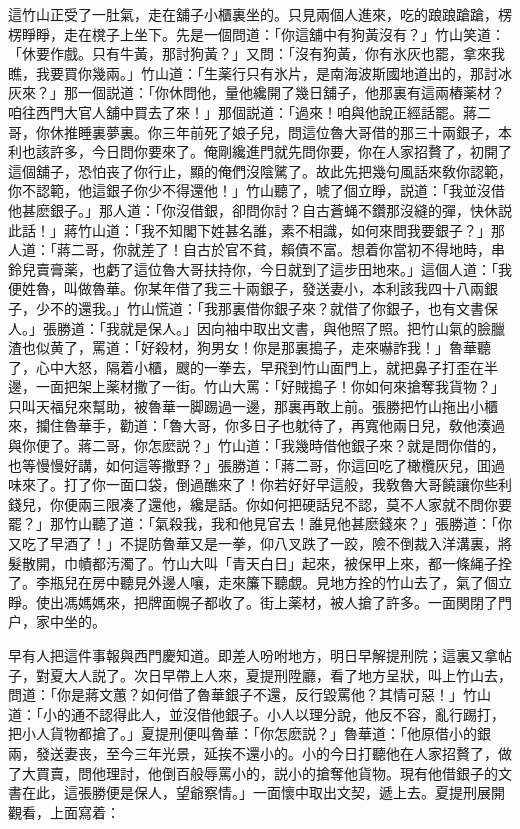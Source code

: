 這竹山正受了一肚氣，走在舖子小櫃裏坐的。只見兩個人進來，吃的踉踉蹌蹌，楞楞睜睜，走在櫈子上坐下。先是一個問道：「你這舖中有狗黃沒有？」竹山笑道：「休要作戲。只有牛黃，那討狗黃？」又問：「沒有狗黃，你有氷灰也罷，拿來我瞧，我要買你幾兩。」竹山道：「生薬行只有氷片，是南海波斯國地道出的，那討冰灰來？」那一個説道：「你休問他，量他纔開了幾日舖子，他那裏有這兩樁薬材？咱往西門大官人舖中買去了來！」那個説道：「過來！咱與他說正經話罷。蔣二哥，你休推睡裏夢裏。你三年前死了娘子兒，問這位魯大哥借的那三十兩銀子，本利也該許多，今日問你要來了。俺剛纔進門就先問你要，你在人家招贅了，初開了這個舖子，恐怕丧了你行止，顯的俺們沒陰騭了。故此先把幾句風話來敎你認範，你不認範，他這銀子你少不得還他！」竹山聽了，唬了個立睜，説道：「我並沒借他甚麽銀子。」那人道：「你沒借銀，卻問你討？自古蒼蝇不鑽那沒縫的彈，快休説此話！」蔣竹山道：「我不知閣下姓甚名誰，素不相識，如何來問我要銀子？」那人道：「蔣二哥，你就差了！自古於官不貧，賴債不富。想着你當初不得地時，串鈴兒賣膏薬，也虧了這位魯大哥扶持你，今日就到了這步田地來。」這個人道：「我便姓魯，叫做魯華。你某年借了我三十兩銀子，發送妻小，本利該我四十八兩銀子，少不的還我。」竹山慌道：「我那裏借你銀子來？就借了你銀子，也有文書保人。」張勝道：「我就是保人。」因向袖中取出文書，與他照了照。把竹山氣的臉臘渣也似黄了，罵道：「好殺材，狗男女！你是那裏搗子，走來嚇詐我！」魯華聽了，心中大怒，隔着小櫃，颼的一拳去，早飛到竹山面門上，就把鼻子打歪在半邊，一面把架上薬材撒了一街。竹山大罵：「好賊搗子！你如何來搶奪我貨物？」只叫天福兒來幫助，被魯華一脚踢過一邊，那裏再敢上前。張勝把竹山拖出小櫃來，攔住魯華手，勸道：「魯大哥，你多日子也躭待了，再寬他兩日兒，敎他湊過與你便了。蔣二哥，你怎麽説？」竹山道：「我幾時借他銀子來？就是問你借的，也等慢慢好講，如何這等撒野？」張勝道：「蔣二哥，你這回吃了橄欖灰兒，囬過味來了。打了你一面口袋，倒過醮來了！你若好好早這般，我敎魯大哥饒讓你些利錢兒，你便兩三限凑了還他，纔是話。你如何把硬話兒不認，莫不人家就不問你要罷？」那竹山聽了道：「氣殺我，我和他見官去！誰見他甚麽錢來？」張勝道：「你又吃了早酒了！」不提防魯華又是一拳，仰八叉跌了一跤，險不倒裁入洋溝裏，將髮散開，巾幘都汚濁了。竹山大叫「青天白日」起來，被保甲上來，都一條䋲子拴了。李瓶兒在房中聽見外邊人嚷，走來簾下聽覷。見地方拴的竹山去了，氣了個立睜。使出馮媽媽來，把牌面幌子都收了。街上薬材，被人搶了許多。一面関閉了門户，家中坐的。

早有人把這件事報與西門慶知道。即差人吩咐地方，明日早解提刑院；這裏又拿帖子，對夏大人説了。次日早帶上人來，夏提刑陞廳，看了地方呈狀，叫上竹山去，問道：「你是蔣文蕙？如何借了魯華銀子不還，反行毀罵他？其情可惡！」竹山道：「小的通不認得此人，並沒借他銀子。小人以理分說，他反不容，亂行踢打，把小人貨物都搶了。」夏提刑便叫魯華：「你怎麽説？」魯華道：「他原借小的銀兩，發送妻丧，至今三年光景，延挨不還小的。小的今日打聽他在人家招贅了，做了大買賣，問他理討，他倒百般辱罵小的，説小的搶奪他貨物。現有他借銀子的文書在此，這張勝便是保人，望爺察情。」一面懷中取出文契，遞上去。夏提刑展開觀看，上面寫着：

